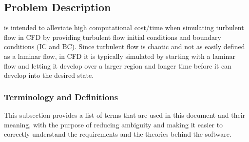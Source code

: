 \documentclass[12pt]{article}
\begin{document}
\subsection{Problem Description} \label{Sec_pd}

\progname{} is intended to alleviate high computational cost/time when simulating turbulent flow in CFD by providing turbulent flow initial conditions and boundary conditions (IC and BC). Since turbulent flow is chaotic and not as easily defined as a laminar flow, in CFD it is typically simulated by starting with a laminar flow and letting it develop over a larger region and longer time before it can develop into the desired state.

\subsubsection{Terminology and  Definitions} \label{sec_termDef}


This subsection provides a list of terms that are used in this document and their meaning, with the purpose of reducing ambiguity and making it easier to correctly understand the requirements and the theories behind the software.
\end{document}
